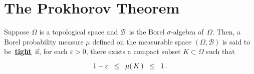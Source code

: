 

\section{The Prokhorov Theorem}
\setcounter{theorem}{0}
\setcounter{equation}{0}


\renewcommand{\theenumi}{\roman{enumi}}
\renewcommand{\labelenumi}{\textnormal{(\theenumi)}$\;\;$}


\begin{definition}[Tightness]
\mbox{}\vskip 0.1cm
\noindent
Suppose $\Omega$ is a topological space and
$\mathcal{B}$\, is the Borel $\sigma$-algebra of \,$\Omega$.
Then, a Borel probability measure $\mu$ defined on the measurable space
$(\Omega,\mathcal{B})$ is said to be \,\underline{\textbf{tight}}\,
if, for each $\varepsilon > 0$, there exists a
compact subset $K \subset \Omega$ such that
\begin{equation*}
1 - \varepsilon \;\; \leq \;\; \mu(\,\overset{{\color{white}.}}{K}\,) \;\; \leq \;\; 1\,.
\end{equation*}
\end{definition}


